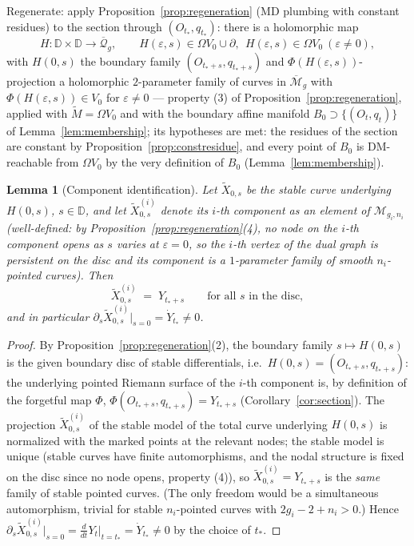 \documentclass[11pt]{article}
\newcommand{\D}{\mathbb{D}}
\newcommand{\cQ}{\mathcal{Q}}
\newcommand{\M}{\mathcal{M}}
\newtheorem{lem}[thm]{Lemma}
\theoremstyle{definition}
\theoremstyle{remark}
\begin{document}
Regenerate: apply Proposition~\ref{prop:regeneration} (MD plumbing with
constant residues) to the section through $(O_{t_*}, q_{t_*})$: there is a
holomorphic map
\[
H : \D \times \D \longrightarrow \overline{\cQ}_g, \qquad
H(\varepsilon, s) \in \Omega V_0 \cup \partial, \ \ H(\varepsilon, s) \in
\Omega V_0 \ (\varepsilon \neq 0),
\]
with $H(0, s)$ the boundary family $(O_{t_*+s},q_{t_*+s})$ and
$\Phi(H(\varepsilon, s))$-projection a holomorphic $2$-parameter family
of curves in $\overline{\M}_g$ with $\Phi(H(\varepsilon, s)) \in V_0$
for $\varepsilon \neq 0$ --- property (3) of
Proposition~\ref{prop:regeneration}, applied with $\widetilde M = \Omega
V_0$ and with the boundary affine manifold $B_0 \supset \{(O_t,q_t)\}$
of Lemma~\ref{lem:membership}; its hypotheses are met: the residues of
the section are constant by Proposition~\ref{prop:constresidue}, and
every point of $B_0$ is DM-reachable from $\Omega V_0$ by the very
definition of $B_0$ (Lemma~\ref{lem:membership}).
\begin{lem}[Component identification]\label{lem:compid}
Let $\widetilde X_{0,s}$ be the stable curve underlying $H(0,s)$,
$s \in \D$, and let $\widetilde X_{0,s}^{(i)}$ denote its $i$-th
component as an element of $\M_{g_i,n_i}$ (well-defined: by
Proposition~\ref{prop:regeneration}(4), no node on the $i$-th component
opens as $s$ varies at $\varepsilon = 0$, so the $i$-th vertex of the
dual graph is persistent on the disc and its component is a
$1$-parameter family of smooth $n_i$-pointed curves). Then
\[
\widetilde X_{0,s}^{(i)} \;=\; Y_{t_*+s}
\qquad\text{for all } s \text{ in the disc},
\]
and in particular
$\partial_s \widetilde X_{0,s}^{(i)}\big|_{s=0} = \dot Y_{t_*} \ne 0$.
\end{lem}

\begin{proof}
By Proposition~\ref{prop:regeneration}(2), the boundary family
$s \mapsto H(0,s)$ is the given boundary disc of stable differentials,
i.e.\ $H(0,s) = (O_{t_*+s}, q_{t_*+s})$: the underlying pointed Riemann
surface of the $i$-th component is, by definition of the forgetful map
$\Phi$, $\Phi(O_{t_*+s}, q_{t_*+s}) = Y_{t_*+s}$
(Corollary~\ref{cor:section}). The projection
$\widetilde X_{0,s}^{(i)}$ of the stable model of the total curve
underlying $H(0,s)$ is normalized with the marked points at the
relevant nodes; the stable model is unique (stable curves have finite
automorphisms, and the nodal structure is fixed on the disc since no
node opens, property (4)), so
$\widetilde X_{0,s}^{(i)} = Y_{t_*+s}$ is the \emph{same} family of
stable pointed curves. (The only freedom would be a simultaneous
automorphism, trivial for stable $n_i$-pointed curves with
$2g_i - 2 + n_i > 0$.) Hence
$\partial_s \widetilde X_{0,s}^{(i)} \big|_{s=0}
= \frac{d}{dt} Y_t \big|_{t = t_*} = \dot Y_{t_*} \neq 0$ by the
choice of $t_*$.
\end{proof}
\end{document}
